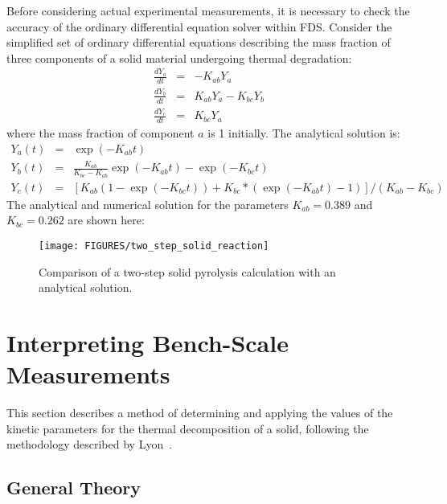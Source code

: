 \documentclass[11pt]{book}
\begin{document}
Before considering actual experimental measurements, it is necessary to check the accuracy of the ordinary differential
equation solver within FDS.
Consider  the simplified set  of ordinary  differential equations  describing the mass
fraction of  three  components of  a  solid material  undergoing thermal
degradation:
\begin{eqnarray}
    \frac{dY_a}{dt} &=&  -K_{ab} Y_a \nonumber  \\
    \frac{dY_b}{dt} &=&   K_{ab} Y_a  -  K_{bc}  Y_b  \\
    \frac{dY_c}{dt} &=&   K_{bc} Y_a
    \nonumber
\end{eqnarray}
where  the  mass  fraction  of  component  $a$  is  1  initially.  The
analytical solution is:
\begin{eqnarray}
    Y_a(t)    &=&    \exp(-K_{ab}t)    \nonumber   \\
    Y_b(t)    &=&    \frac{K_{ab}}{K_{bc}-K_{ab}} \exp(-K_{ab} t)  - \exp(-K_{bc} t) \\
    Y_c(t)    &=&    \left[   K_{ab}    (1-\exp(-K_{bc} t) )    +  K_{bc}*(\exp(-K_{ab} t) -1) \right] / (K_{ab}-K_{bc})
\end{eqnarray}
The analytical and  numerical solution for the parameters $K_{ab} = 0.389$ and $K_{bc} = 0.262$ are shown here:

\begin{figure}[ht]
\begin{center}
\texttt{[image: FIGURES/two\_step\_solid\_reaction]}
\end{center}
\caption[The {\bf two\_step\_solid\_reaction} test case.]{Comparison of a two-step solid pyrolysis calculation with an analytical solution.}
\label{two_step_solid_reaction}
\end{figure}




\clearpage

\section{Interpreting Bench-Scale Measurements}
\label{solid_kinetics}

This section describes a method of determining and applying the values of the kinetic parameters for the thermal
decomposition of a solid, following the methodology described by Lyon~\cite{Lyon:FM2000}.


\subsection{General Theory}
\end{document}
